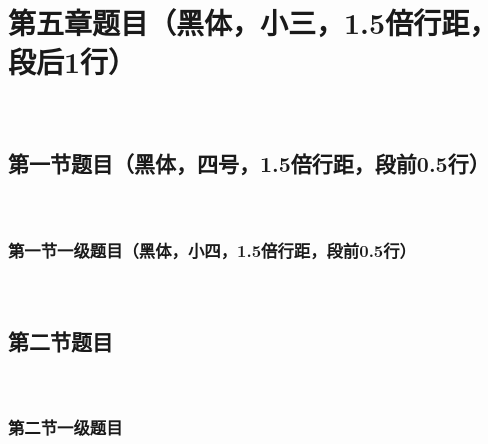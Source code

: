 
\chapter{第五章题目（黑体，小三，1.5倍行距，段后1行）}
\label{chap04}
~\\
\section{第一节题目（黑体，四号，1.5倍行距，段前0.5行）}
~\\
\subsection{第一节一级题目（黑体，小四，1.5倍行距，段前0.5行）}
~\\
\section{第二节题目}
~\\
\subsection{第二节一级题目}
~\\
